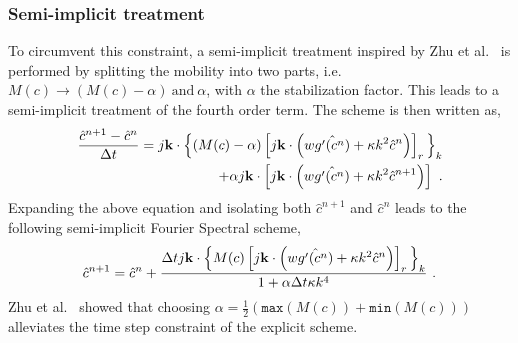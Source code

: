     \subsubsection{Semi-implicit treatment}
    To circumvent this constraint, a semi-implicit treatment inspired by Zhu et al.\ \cite{ZhuChenShenTikare1999} is performed by splitting the mobility into two parts, i.e.\ $M(c) \rightarrow (M(c) - \alpha)\ \text{and}\ \alpha$, with $\alpha$ the stabilization factor. This leads to a semi-implicit treatment of the fourth order term.
    The scheme is then written as,
    \begin{equation}
        \begin{aligned}
            \frac{\hat{c}^{n+1}-\hat{c}^n}{\Delta t} = j\mathbf{k} \cdot \Bigl\{ (M(c) - \alpha) \left[j\mathbf{k} \cdot \left(w\hat{g'(c^n)} + \kappa k^2 \hat{c}^n\right)\right]_r \Bigl\}_k\\
            + \alpha j\mathbf{k} \cdot \left[j\mathbf{k} \cdot \left(w\hat{g'(c^n)} + \kappa k^2 \hat{c}^{n+1}\right)\right]\ .
        \end{aligned}
    \end{equation}
    Expanding the above equation and isolating both $\hat{c}^{n+1}$ and $\hat{c}^n$ leads to the following semi-implicit Fourier Spectral scheme,
    \begin{equation}
        \begin{aligned}
            \hat{c}^{n+1} = \hat{c}^n + \frac{\Delta t j\mathbf{k} \cdot \Bigl\{ M(c) \left[j\mathbf{k} \cdot \left(w\hat{g'(c^n)} + \kappa k^2 \hat{c}^n\right)\right]_r \Bigl\}_k}{1 + \alpha \Delta t \kappa k^4}\ .
        \end{aligned}
        \label{eq:2-semi-implicit}
    \end{equation}
    Zhu et al.\ \cite{ZhuChenShenTikare1999} showed that choosing $\alpha = \frac{1}{2} (\texttt{max}(M(c)) + \texttt{min}(M(c)))$ alleviates the time step constraint of the explicit scheme.

